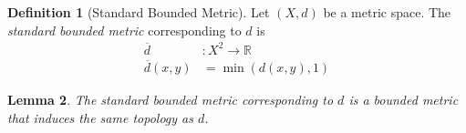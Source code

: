 \documentclass{book}
\newtheorem{lm}{Lemma}[chapter]
\theoremstyle{definition}
\newtheorem{df}[lm]{Definition}
\begin{document}
  \begin{df}[Standard Bounded Metric]
    \label{df:topology:metric:standard_bounded}
    Let $(X, d)$ be a metric space. The \emph{standard bounded metric} 
    corresponding to $d$ is
    \begin{align*}
      \overline{d} & : X^2 \rightarrow \mathbb{R} \\
      \overline{d}(x, y) & = \min(d(x, y), 1)
    \end{align*}
  \end{df}
  
  \begin{lm}
    \label{lm:topology:metric:bounded}
    The standard bounded metric corresponding to $d$ is a bounded metric that 
    induces the 
    same topology as $d$.
  \end{lm}
  
\end{document}
